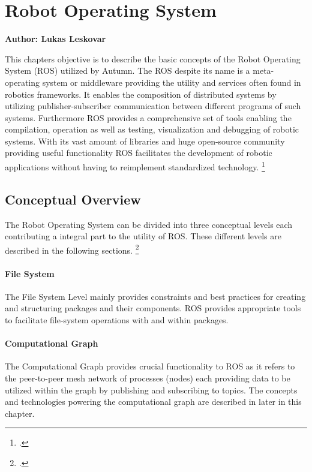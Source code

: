 \chapter{Robot Operating System}
\label{chapter:ros}

\textbf{Author: Lukas Leskovar} 

This chapters objective is to describe the basic concepts of the Robot Operating System (ROS) utilized by Autumn. The ROS despite its name is a meta-operating system or middleware providing the utility and services often found in robotics frameworks. It enables the composition of distributed systems by utilizing publisher-subscriber communication between different programs of such systems. Furthermore ROS provides a comprehensive set of tools enabling the compilation, operation as well as testing, visualization and debugging of robotic systems. With its vast amount of libraries and huge open-source community providing useful functionality ROS facilitates the development of robotic applications without having to reimplement standardized technology. \footcite{openSourceRoboticsFoundationDefinitionNodate}


\section{Conceptual Overview}
The Robot Operating System can be divided into three conceptual levels each contributing a integral part to the utility of ROS. These different levels are described in the following sections. \footcite{openSourceRoboticsFoundationConceptsNodate}

\subsubsection{File System}
The File System Level mainly provides constraints and best practices for creating and structuring packages and their components. 
ROS provides appropriate tools to facilitate file-system operations with and within packages.

\subsubsection{Computational Graph}
The Computational Graph provides crucial functionality to ROS as it refers to the peer-to-peer mesh network of processes (nodes) each providing data to be utilized within the graph by publishing and subscribing to topics.
The concepts and technologies powering the computational graph are described in later in this chapter.

